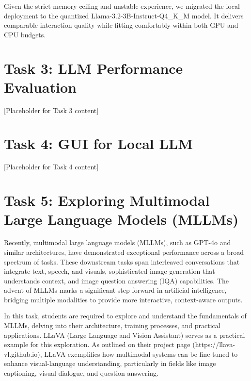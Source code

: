 \documentclass[12pt,a4paper]{article}
\begin{document}
Given the strict memory ceiling and unstable experience, we migrated the local deployment to the quantized Llama-3.2-3B-Instruct-Q4\_K\_M model. It delivers comparable interaction quality while fitting comfortably within both GPU and CPU budgets.


\section{Task 3: LLM Performance Evaluation}

[Placeholder for Task 3 content]

\section{Task 4: GUI for Local LLM}

[Placeholder for Task 4 content]

\section{Task 5: Exploring Multimodal Large Language Models (MLLMs)}

Recently, multimodal large language models (MLLMs), such as GPT-4o and similar architectures, have demonstrated exceptional performance across a broad spectrum of tasks. These downstream tasks span interleaved conversations that integrate text, speech, and visuals, sophisticated image generation that understands context, and image question answering (IQA) capabilities. The advent of MLLMs marks a significant step forward in artificial intelligence, bridging multiple modalities to provide more interactive, context-aware outputs.

In this task, students are required to explore and understand the fundamentals of MLLMs, delving into their architecture, training processes, and practical applications. LLaVA (Large Language and Vision Assistant) serves as a practical example for this exploration. As outlined on their project page (https://llava-vl.github.io), LLaVA exemplifies how multimodal systems can be fine-tuned to enhance visual-language understanding, particularly in fields like image captioning, visual dialogue, and question answering.
\end{document}
